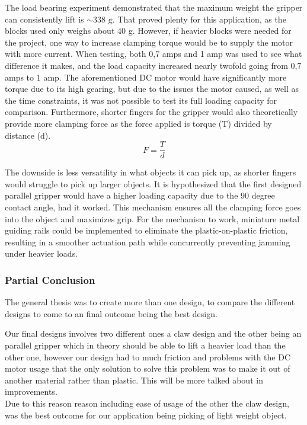 The load bearing experiment demonstrated that the maximum weight the gripper can consistently lift is $ \sim 338\text{ g}$. That proved plenty for this application, as the blocks used only weighs about 40 g. However, if heavier blocks were needed for the project, one way to increase clamping torque would be to supply the motor with more current. When testing, both 0,7 amps and 1 amp was used to see what difference it makes, and the load capacity increased nearly twofold going from 0,7 amps to 1 amp. The aforementioned DC motor would have significantly more torque due to its high gearing, but due to the issues the motor caused, as well as the time constraints, it was not possible to test its full loading capacity for comparison. Furthermore, shorter fingers for the gripper would also theoretically provide more clamping force as the force applied is torque (T) divided by distance (d).
$$F = \frac{T}{d}$$

The downside is less versatility in what objects it can pick up, as shorter fingers would struggle to pick up larger objects. It is hypothesized that the first designed parallel gripper would have a higher loading capacity due to the 90 degree contact angle, had it worked. This mechanism ensures all the clamping force goes into the object and maximizes grip. For the mechanism to work, miniature metal guiding rails could be implemented to eliminate the plastic-on-plastic friction, resulting in a smoother actuation path while concurrently preventing jamming under heavier loads.




\subsubsection{Partial Conclusion}
The general thesis was to create more than one design, to compare the different designs to come to an final outcome being the best design. 

Our final designs involves two different ones a claw design and the other being an parallel gripper which in theory should be able to lift a heavier load than the other one, however our design had to much friction and problems with the DC motor usage that the only solution to solve this problem was to make it out of another material rather than plastic. This will be more talked about in improvements.\\

Due to this reason reason including ease of usage of the other the claw design, was the best outcome for our application being picking of light weight object. 








